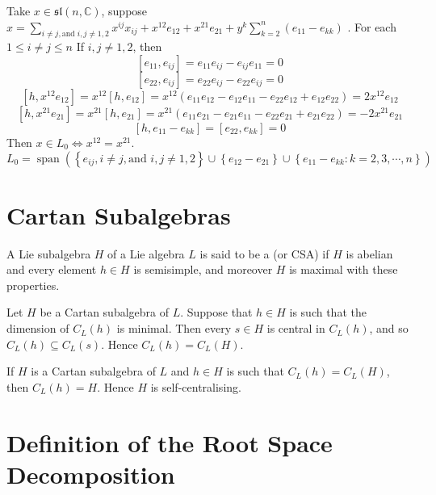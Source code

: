 \documentclass[../main.tex]{subfiles}
\begin{document}
\begin{solution}
   Take \(  x\in \mathfrak{sl}\left( n,\mathbb{C}  \right)   \), suppose \(  x=\sum _{i\neq j,\text{and }i, j\neq 1,2}x^{ij}x_{ij}+  x^{12}e_{12}+ x^{21}e_{21} + y^{k}\sum _{k= 2}^{n}\left( e_{11}-e_{kk} \right)  \) .  For each \(  1\le i\neq j\le  n  \) 
   If \(  i,j \neq 1,2  \), then \[
   \left[ e_{11},e_{ij} \right]= e_{11}e_{ij}-e_{ij}e_{11}= 0 
   \] \[
   \left[ e_{22},e_{ij} \right]= e_{22}e_{ij}-e_{22}e_{ij}= 0 
   \] \[
   [h,x^{12}e_{12}]= x^{12}\left[ h,e_{12} \right]= x^{12}\left( e_{11}e_{12}-e_{12}e_{11}-e_{22}e_{12}+ e_{12}e_{22} \right)  = 2x^{12}e_{12}
   \] \[
   \left[ h, x^{21}e_{21} \right]= x^{21}\left[ h,e_{21} \right]= x^{21}\left( e_{11}e_{21}-e_{21}e_{11}-e_{22}e_{21}+ e_{21}e_{22} \right)   =- 2x^{21}e_{21}
   \] \[
   \left[ h, e_{11}-e_{kk} \right]= [e_{22},e_{kk}]= 0 
   \]Then \(  x \in L_0\iff x^{12}= x^{21}   \).  \[
   L_0= \operatorname{span}\left( \left\{ e_{ij}, i\neq j, \text{and } i,j\neq 1,2 \right\}\cup \left\{ e_{12}-e_{21} \right\}\cup \left\{ e_{11}-e_{kk}: k= 2,3,\cdots ,n \right\} \right) 
   \]
\end{solution}

\section{Cartan Subalgebras}

\begin{definition}{}{}
A Lie subalgebra $H$ of a Lie algebra $L$ is said to be a  (or CSA) if $H$ is abelian and every element $h \in H$ is semisimple, and moreover $H$ is maximal with these properties.
\end{definition}

\begin{lemma}{}{}
Let $H$ be a Cartan subalgebra of $L$. Suppose that $h \in H$ is such that the dimension of $C_L(h)$ is minimal. Then every $s \in H$ is central in $C_L(h)$, and so $C_L(h) \subseteq C_L(s)$. Hence $C_L(h) = C_L(H)$.
\end{lemma}

\begin{theorem}{}{}
If $H$ is a Cartan subalgebra of $L$ and $h \in H$ is such that $C_L(h) = C_L(H)$, then $C_L(h) = H$. Hence $H$ is self-centralising.
\end{theorem}

\section{Definition of the Root Space Decomposition}
\end{document}
